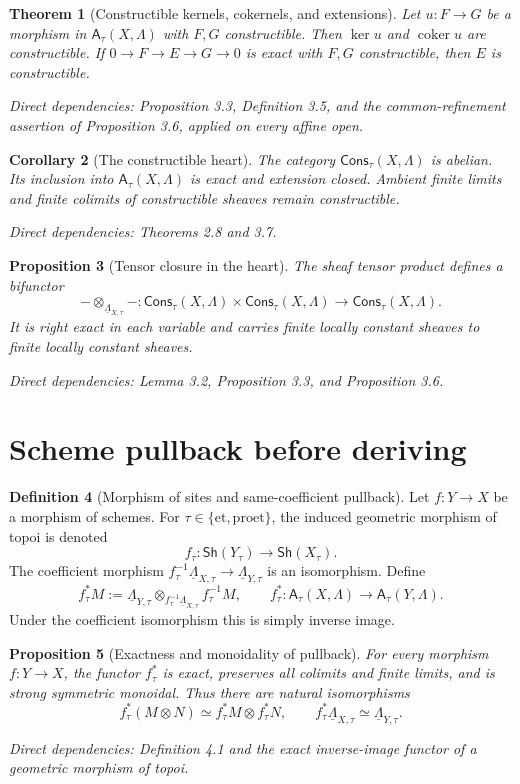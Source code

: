 \documentclass[10pt]{article}
\newtheorem{theorem}{Theorem}[section]
\newtheorem{proposition}[theorem]{Proposition}
\newtheorem{corollary}[theorem]{Corollary}
\theoremstyle{definition}
\newtheorem{definition}[theorem]{Definition}
\newcommand{\Lam}{\Lambda}
\newcommand{\Sh}{\mathsf{Sh}}
\newcommand{\Cons}{\mathsf{Cons}}
\newcommand{\et}{\mathrm{et}}
\newcommand{\proet}{\mathrm{proet}}
\newcommand{\dep}[1]{\par\smallskip\noindent\textit{Direct dependencies: #1}}
\begin{document}
\begin{theorem}[Constructible kernels, cokernels, and extensions]
Let $u:F\to G$ be a morphism in $\mathsf A_\tau(X,\Lam)$ with $F,G$
constructible.  Then $\ker u$ and $\operatorname{coker}u$ are constructible.
If $0\to F\to E\to G\to0$ is exact with $F,G$ constructible, then $E$ is
constructible.
\dep{Proposition 3.3, Definition 3.5, and the common-refinement assertion of
Proposition 3.6, applied on every affine open.}
\end{theorem}

\begin{corollary}[The constructible heart]
The category $\Cons_\tau(X,\Lam)$ is abelian.  Its inclusion into
$\mathsf A_\tau(X,\Lam)$ is exact and extension closed.  Ambient finite limits
and finite colimits of constructible sheaves remain constructible.
\dep{Theorems 2.8 and 3.7.}
\end{corollary}

\begin{proposition}[Tensor closure in the heart]
The sheaf tensor product defines a bifunctor
\[
-\otimes_{\underline\Lam_{X,\tau}}-:
\Cons_\tau(X,\Lam)\times\Cons_\tau(X,\Lam)
\longrightarrow\Cons_\tau(X,\Lam).
\]
It is right exact in each variable and carries finite locally constant
sheaves to finite locally constant sheaves.
\dep{Lemma 3.2, Proposition 3.3, and Proposition 3.6.}
\end{proposition}

\section{Scheme pullback before deriving}

\begin{definition}[Morphism of sites and same-coefficient pullback]
Let $f:Y\to X$ be a morphism of schemes.  For
$\tau\in\{\et,\proet\}$, the induced geometric morphism of topoi is denoted
\[
f_\tau:\Sh(Y_\tau)\longrightarrow\Sh(X_\tau).
\]
The coefficient morphism
$f_\tau^{-1}\underline\Lam_{X,\tau}\to\underline\Lam_{Y,\tau}$ is an
isomorphism.  Define
\[
f_\tau^*M:=
\underline\Lam_{Y,\tau}\otimes_{f_\tau^{-1}\underline\Lam_{X,\tau}}
f_\tau^{-1}M,
\qquad
f_\tau^*: \mathsf A_\tau(X,\Lam)\to\mathsf A_\tau(Y,\Lam).
\]
Under the coefficient isomorphism this is simply inverse image.
\end{definition}

\begin{proposition}[Exactness and monoidality of pullback]
For every morphism $f:Y\to X$, the functor $f_\tau^*$ is exact, preserves all
colimits and finite limits, and is strong symmetric monoidal.  Thus there are
natural isomorphisms
\[
f_\tau^*(M\otimes N)\simeq f_\tau^*M\otimes f_\tau^*N,
\qquad f_\tau^*\underline\Lam_{X,\tau}\simeq
\underline\Lam_{Y,\tau}.
\]
\dep{Definition 4.1 and the exact inverse-image functor of a geometric
morphism of topoi.}
\end{proposition}
\end{document}
